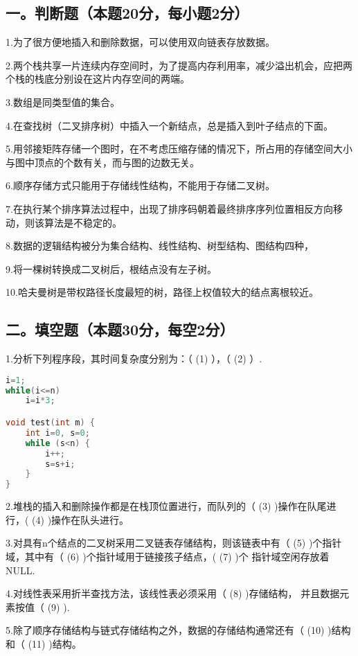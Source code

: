 
\subsection{一。判断题（本题20分，每小题2分）}
1.为了很方便地插入和删除数据，可以使用双向链表存放数据。

2.两个栈共享一片连续内存空间时，为了提高内存利用率，减少溢出机会，应把两个栈的栈底分别设在这片内存空间的两端。

3.数组是同类型值的集合。

4.在查找树（二叉排序树）中插入一个新结点，总是插入到叶子结点的下面。

5.用邻接矩阵存储一个图时，在不考虑压缩存储的情况下，所占用的存储空间大小与图中顶点的个数有关，而与图的边数无关。

6.顺序存储方式只能用于存储线性结构，不能用于存储二叉树。

7.在执行某个排序算法过程中，出现了排序码朝着最终排序序列位置相反方向移动，则该算法是不稳定的。

8.数据的逻辑结构被分为集合结构、线性结构、树型结构、图结构四种，

9.将一棵树转换成二叉树后，根结点没有左子树。

10.哈夫曼树是带权路径长度最短的树，路径上权值较大的结点离根较近。


\subsection{二。填空题（本题30分，每空2分）}
1.分析下列程序段，其时间复杂度分别为：（ (1) ），（ (2) ）.
\begin{lstlisting}[language=cpp]
i=1;
while(i<=n)
    i=i*3;

void test(int m) {
    int i=0, s=0;
    while (s<n) {
        i++;
        s=s+i;
    }
}
\end{lstlisting}

2.堆栈的插入和删除操作都是在栈顶位置进行，而队列的（ (3) )操作在队尾进行，( (4) )操作在队头进行。

3.对具有n个结点的二叉树采用二叉链表存储结构，则该链表中有（ (5) )个指针域，其中有（ (6) )个指针域用于链接孩子结点，( (7) )个 指针域空闲存放着NULL.

4.对线性表采用折半查找方法，该线性表必须采用（ (8) )存储结构， 并且数据元素按值（ (9) ).

5.除了顺序存储结构与链式存储结构之外，数据的存储结构通常还有（ (10) )结构和（ (11) )结构。

